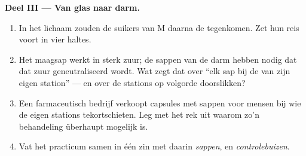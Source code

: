 \begin{problem}
\medskip\noindent\textbf{Deel III --- Van glas naar darm.}
\begin{enumerate}[resume]
  \item In het lichaam zouden de suikers van M daarna de 
        tegenkomen. Zet hun reis voort in vier haltes.
  \item Het maagsap werkt in sterk zuur; de sappen van de darm hebben
        nodig dat dat zuur geneutraliseerd wordt. Wat zegt dat over ``elk
        sap bij de  van zijn eigen station'' --- en over de
        stations op volgorde doorslikken?
  \item Een farmaceutisch bedrijf verkoopt capsules met sappen voor
        mensen bij wie de eigen stations tekortschieten. Leg met het rek
        uit waarom zo'n behandeling überhaupt mogelijk is.
  \item Vat het practicum samen in één zin met daarin \emph{sappen},
        \emph{} en \emph{controlebuizen}.
\end{enumerate}
\end{problem}
